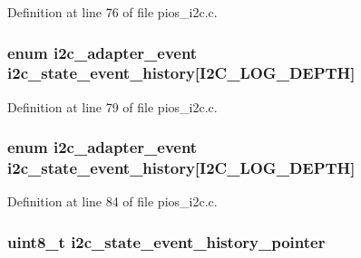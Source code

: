 Definition at line 76 of file pios\-\_\-i2c.\-c.

\hypertarget{group___p_i_o_s___i2_c_gad2fddef6926d27512901cbe84b7b99bd}{
\subsubsection[{i2c\-\_\-state\-\_\-event\-\_\-history}]{\setlength{\rightskip}{0pt plus 5cm}enum {\bf i2c\-\_\-adapter\-\_\-event} i2c\-\_\-state\-\_\-event\-\_\-history\mbox{[}I2\-C\-\_\-\-L\-O\-G\-\_\-\-D\-E\-P\-T\-H\mbox{]}}}\label{group___p_i_o_s___i2_c_gad2fddef6926d27512901cbe84b7b99bd}


Definition at line 79 of file pios\-\_\-i2c.\-c.

\hypertarget{group___p_i_o_s___i2_c_gad2fddef6926d27512901cbe84b7b99bd}{
\subsubsection[{i2c\-\_\-state\-\_\-event\-\_\-history}]{\setlength{\rightskip}{0pt plus 5cm}enum {\bf i2c\-\_\-adapter\-\_\-event} i2c\-\_\-state\-\_\-event\-\_\-history\mbox{[}I2\-C\-\_\-\-L\-O\-G\-\_\-\-D\-E\-P\-T\-H\mbox{]}}}\label{group___p_i_o_s___i2_c_gad2fddef6926d27512901cbe84b7b99bd}


Definition at line 84 of file pios\-\_\-i2c.\-c.

\hypertarget{group___p_i_o_s___i2_c_gabdb9d9357371d1ece20779da0d69d27b}{
\subsubsection[{i2c\-\_\-state\-\_\-event\-\_\-history\-\_\-pointer}]{ {\bf uint8\-\_\-t} i2c\-\_\-state\-\_\-event\-\_\-history\-\_\-pointer}}\label{group___p_i_o_s___i2_c_gabdb9d9357371d1ece20779da0d69d27b}


